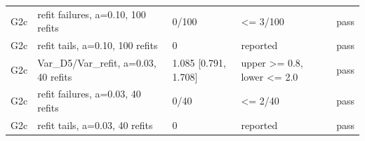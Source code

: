\begin{tabular}{lllll}
G2c & refit failures, a=0.10, 100 refits & 0/100 & \textless{}= 3/100 & pass \\
G2c & refit tails, a=0.10, 100 refits & 0 & reported & pass \\
G2c & Var\_D5/Var\_refit, a=0.03, 40 refits & 1.085 [0.791, 1.708] & upper \textgreater{}= 0.8, lower \textless{}= 2.0 & pass \\
G2c & refit failures, a=0.03, 40 refits & 0/40 & \textless{}= 2/40 & pass \\
G2c & refit tails, a=0.03, 40 refits & 0 & reported & pass \\
\bottomrule
\end{tabular}
